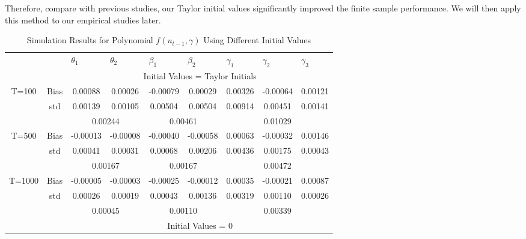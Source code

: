 \documentclass[a4paper,12pt,times,numbered,print,index]{report}
\numberwithin{equation}{section}
\begin{document}
Therefore, compare with previous studies, our Taylor initial values significantly improved the finite sample performance. We will then apply this method to our empirical studies later. 
\begin{table}[htbp]
	\centering
	\caption{Simulation Results for Polynomial $f\left( u_{t-1},\gamma\right)$ Using Different Initial Values}
	\begin{adjustbox}{max width=0.8\textwidth}
	\begin{tabular}{ccccccccc}
		\toprule
		&       & \multicolumn{1}{l}{$\theta_1$} & \multicolumn{1}{l}{$\theta_2$} & \multicolumn{1}{l}{$\beta_1$} & \multicolumn{1}{l}{$\beta_2$} & \multicolumn{1}{l}{$\gamma_1$} & \multicolumn{1}{l}{$\gamma_2$} & \multicolumn{1}{l}{$\gamma_3$} \\
		&       & \multicolumn{7}{c}{Initial Values = Taylor Initials} \\
		\midrule
		\multirow{3}[1]{*}{T=100} & Bias  & 0.00088 & 0.00026 & -0.00079 & 0.00029 & 0.00326 & -0.00064 & 0.00121 \\
		& std   & 0.00139 & 0.00105 & 0.00504 & 0.00504 & 0.00914 & 0.00451 & 0.00141 \\
		&       & \multicolumn{2}{c}{0.00244} & \multicolumn{2}{c}{0.00461} & \multicolumn{3}{c}{0.01029} \\
		\multirow{3}[0]{*}{T=500} & Bias  & -0.00013 & -0.00008 & -0.00040 & -0.00058 & 0.00063 & -0.00032 & 0.00146 \\
		& std   & 0.00041 & 0.00031 & 0.00068 & 0.00206 & 0.00436 & 0.00175 & 0.00043 \\
		&       & \multicolumn{2}{c}{0.00167} & \multicolumn{2}{c}{0.00167} & \multicolumn{3}{c}{0.00472} \\
		\multirow{3}[1]{*}{T=1000} & Bias  & -0.00005 & -0.00003 & -0.00025 & -0.00012 & 0.00035 & -0.00021 & 0.00087 \\
		& std   & 0.00026 & 0.00019 & 0.00043 & 0.00136 & 0.00319 & 0.00110 & 0.00026 \\
		&       & \multicolumn{2}{c}{0.00045} & \multicolumn{2}{c}{0.00110} & \multicolumn{3}{c}{0.00339} \\
		\midrule
		&       & \multicolumn{7}{c}{Initial Values = 0} \\

\end{tabular}
\end{adjustbox}
\end{table}
\end{document}
